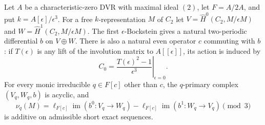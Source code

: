 \begin{proposition}
\label{C:cubic_Bockstein}
Let $A$ be a characteristic-zero DVR with maximal ideal $(2)$,
let $F=A/2A$, and put $k=A[\epsilon]/\epsilon^3$.
For a free $k$-representation $M$ of $C_2$ let
$V=\widehat H^0(C_2,M/\epsilon M)$ and
$W=\widehat H^1(C_2,M/\epsilon M)$.
The first $\epsilon$-Bockstein gives a natural two-periodic
differential $b$ on $V\oplus W$.
There is also a natural even operator $c$ commuting with $b$:
if $T(\epsilon)$ is any lift of the involution matrix to
$A[[\epsilon]]$, its action is induced by
\[
 C_0=\left.\frac{T(\epsilon)^2-1}{\epsilon^3}
                         \right|_{\epsilon=0}.         \tag{C.1.21}
\]
For every monic irreducible $q\in F[c]$ other than $c$, the
$q$-primary complex $(V_q,W_q,b)$ is acyclic, and
\[
 \nu_q(M)=\ell_{F[c]}\operatorname{im}(b^0:V_q\to W_q)
           -\ell_{F[c]}\operatorname{im}(b^1:W_q\to V_q)
                 \pmod3                               \tag{C.1.22}
\]
is additive on admissible short exact sequences.
\end{proposition}
